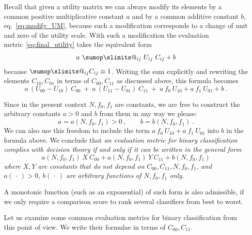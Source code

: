 \documentclass[\ifafour a4paper,12pt,\else a5paper,10pt,\fi%
onecolumn,oneside,article,%
british%
]{memoir}
\makeatletter
\theoremstyle{remark}
\theoremstyle{innote}
\def\sum{\DOTSI\sumop\slimits@}
\newcommand*{\dotv}{\mathord{\,\cdot\,}}%
\renewcommand*{\|}[1][]{\nonscript\:#1\vert\nonscript\:\mathopen{}}
\newcommand*{\eqn}{eq.}%
\newcommand*{\cx}{X}
\newcommand*{\cy}{Y}
\makeatother
\begin{document}
Recall that given a utility matrix we can always modify its elements by a common positive multiplicative constant $a$ and by a common additive constant $b$, \eqn~\eqref{eq:modify_UM}, because such a modification corresponds to a change of unit and zero of the utility scale. With such a modification the evaluation metric~\eqref{eq:final_utility} takes the equivalent form
\begin{equation}
  \label{eq:final_utility_modified}
 a\ \sum_{ij} \ U_{ij}\ C_{ij} + b
\end{equation}
because $\sum_{ij} C_{ij} \equiv 1$. Writing the sum explicitly and rewriting the elements $C_{10}, C_{01}$ in terms of $C_{00}, C_{11}$ as discussed above, this formula becomes 
\begin{equation}
  \label{eq:final_utility_binary}
    a\ (U_{00} - U_{10})\ C_{00} \ + \ 
    a\ (U_{11} - U_{01})\ C_{11} \ + \ 
    a\ f_{0}\ U_{10} + a\ f_{1}\ U_{01} +  b \ .
\end{equation}

Since in the present context $N, f_{0}, f_{1}$ are constants, we are free to construct the arbitrary constants $a > 0$ and $b$ from them in any way we please:
\begin{equation}
  \label{eq:constants_functions}
  a = a(N, f_{0}, f_{1}) > 0\ , \qquad
  b = b(N, f_{0}, f_{1}) \ .
\end{equation}
We can also use this freedom to include the term $a\ f_{0}\ U_{10} + a\ f_{1}\ U_{01}$ into $b$ in the formula above. We conclude that \emph{an evaluation metric for binary classification complies with decision theory if and only if it can be written in the general form}
\begin{equation}
  \label{eq:general_valuation_metric}
  a(N, f_{0}, f_{1})\ \cx\ C_{00} +
  a(N, f_{0}, f_{1})\ \cy\  C_{11} +
  b(N, f_{0}, f_{1})
\end{equation}
\emph{where $\cx,\cy$ are constants that do not depend on $C_{00}, C_{11}, N, f_{0}, f_{1}$, and $a(\dotv)>0$, $b(\dotv)$ are arbitrary functions of $N, f_{0}, f_{1}$ only.}

A monotonic function (such as an exponential) of such form is also admissible, if we only require a comparison score to rank several classifiers from best to worst.

Let us examine some common evaluation metrics for binary classification from this point of view. We write their formulae in terms of $C_{00}, C_{11}$.
\end{document}
